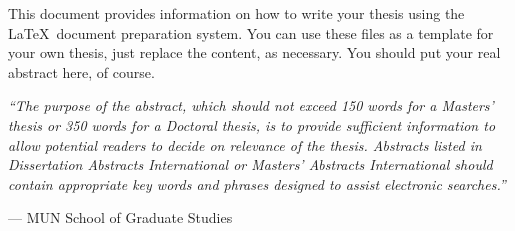 
This document provides information on how to write your thesis using
the \LaTeX\ document preparation system.  You can use these files as a
template for your own thesis, just replace the content, as necessary.
You should put your real abstract here, of course.

\vspace{1cm}

\emph{``The purpose of the abstract, which should not exceed 150 words for
a Masters' thesis or 350 words for a Doctoral thesis, is to provide
sufficient information to allow potential readers to decide on relevance
of the thesis. Abstracts listed in Dissertation Abstracts International
or Masters' Abstracts International should contain appropriate key
words and phrases designed to assist electronic searches.''}

\hfill --- MUN School of Graduate Studies
